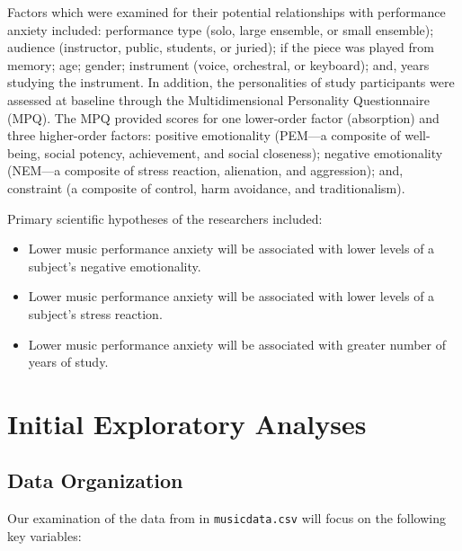 \documentclass[
]{krantz}
\providecommand{\tightlist}{%
  \setlength{\itemsep}{0pt}\setlength{\parskip}{0pt}}
\begin{document}
Factors which were examined for their potential relationships with performance anxiety included: performance type (solo, large ensemble, or small ensemble); audience (instructor, public, students, or juried); if the piece was played from memory; age; gender; instrument (voice, orchestral, or keyboard); and, years studying the instrument. In addition, the personalities of study participants were assessed at baseline through the Multidimensional Personality Questionnaire (MPQ). The MPQ provided scores for one lower-order factor (absorption) and three higher-order factors: positive emotionality (PEM---a composite of well-being, social potency, achievement, and social closeness); negative emotionality (NEM---a composite of stress reaction, alienation, and aggression); and, constraint (a composite of control, harm avoidance, and traditionalism).

Primary scientific hypotheses of the researchers included:

\begin{itemize}
\tightlist
\item
  Lower music performance anxiety will be associated with lower levels of a subject's negative emotionality.
\item
  Lower music performance anxiety will be associated with lower levels of a subject's stress reaction.
\item
  Lower music performance anxiety will be associated with greater number of years of study.
\end{itemize}

\section{Initial Exploratory Analyses}\label{explore}

\subsection{Data Organization}\label{organizedata1}

Our examination of the data from \citet{Miller2010} in \texttt{musicdata.csv} will focus on the following key variables:
\end{document}
